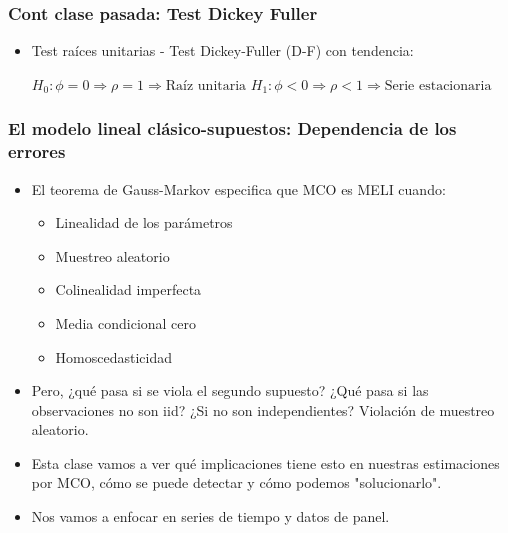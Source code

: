 \documentclass{beamer}
\begin{document}
\begin{frame}
\frametitle{Cont clase pasada: Test Dickey Fuller }

\begin{itemize}
  \item Test raíces unitarias - Test Dickey-Fuller (D-F) con tendencia:

  \( H_0: \phi = 0 \Rightarrow \rho = 1 \Rightarrow \text{Raíz unitaria} \)
\( H_1: \phi < 0 \Rightarrow \rho < 1 \Rightarrow \text{Serie estacionaria} \)
 
\end{itemize}

\end{frame}
\begin{frame}
\frametitle{El modelo lineal clásico-supuestos: Dependencia de los errores}

\begin{itemize}
  \item El teorema de Gauss-Markov especifica que MCO es MELI cuando:
  \begin{itemize}
    \item Linealidad de los parámetros
    \item Muestreo aleatorio
    \item Colinealidad imperfecta
    \item Media condicional cero
    \item Homoscedasticidad
  \end{itemize}
  \item Pero, ¿qué pasa si se viola el segundo supuesto? ¿Qué pasa si las observaciones no son iid? ¿Si no son independientes? Violación de muestreo aleatorio.
  \item Esta clase vamos a ver qué implicaciones tiene esto en nuestras estimaciones por MCO, cómo se puede detectar y cómo podemos "solucionarlo".
  \item Nos vamos a enfocar en series de tiempo y datos de panel.
\end{itemize}

\end{frame}
\end{document}

